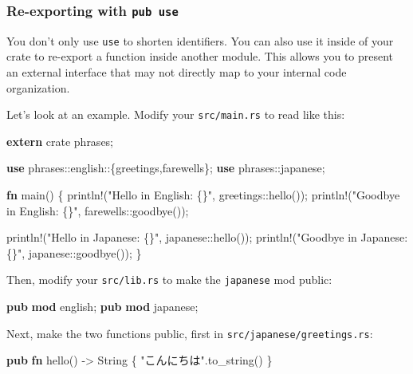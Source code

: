\documentclass[a4paper,]{book}
\newenvironment{Shaded}{\begin{snugshade}}{\end{snugshade}}
\newcommand{\KeywordTok}[1]{\textcolor[rgb]{0.13,0.29,0.53}{\textbf{{#1}}}}
\newcommand{\StringTok}[1]{\textcolor[rgb]{0.31,0.60,0.02}{{#1}}}
\newcommand{\OtherTok}[1]{\textcolor[rgb]{0.56,0.35,0.01}{{#1}}}
\newcommand{\NormalTok}[1]{{#1}}
\begin{document}
\subsubsection{\texorpdfstring{Re-exporting with
\texttt{pub\ use}}{Re-exporting with pub use}}\label{re-exporting-with-pub-use}

You don't only use \texttt{use} to shorten identifiers. You can also use
it inside of your crate to re-export a function inside another module.
This allows you to present an external interface that may not directly
map to your internal code organization.

Let's look at an example. Modify your \texttt{src/main.rs} to read like
this:

\begin{Shaded}
\begin{Highlighting}[]
\KeywordTok{extern} \NormalTok{crate phrases;}

\KeywordTok{use} \NormalTok{phrases::english::\{greetings,farewells\};}
\KeywordTok{use} \NormalTok{phrases::japanese;}

\KeywordTok{fn} \NormalTok{main() \{}
    \OtherTok{println!}\NormalTok{(}\StringTok{"Hello in English: \{\}"}\NormalTok{, greetings::hello());}
    \OtherTok{println!}\NormalTok{(}\StringTok{"Goodbye in English: \{\}"}\NormalTok{, farewells::goodbye());}

    \OtherTok{println!}\NormalTok{(}\StringTok{"Hello in Japanese: \{\}"}\NormalTok{, japanese::hello());}
    \OtherTok{println!}\NormalTok{(}\StringTok{"Goodbye in Japanese: \{\}"}\NormalTok{, japanese::goodbye());}
\NormalTok{\}}
\end{Highlighting}
\end{Shaded}

Then, modify your \texttt{src/lib.rs} to make the \texttt{japanese} mod
public:

\begin{Shaded}
\begin{Highlighting}[]
\KeywordTok{pub} \KeywordTok{mod} \NormalTok{english;}
\KeywordTok{pub} \KeywordTok{mod} \NormalTok{japanese;}
\end{Highlighting}
\end{Shaded}

Next, make the two functions public, first in
\texttt{src/japanese/greetings.rs}:

\begin{Shaded}
\begin{Highlighting}[]
\KeywordTok{pub} \KeywordTok{fn} \NormalTok{hello() -> String \{}
    \StringTok{"こんにちは"}\NormalTok{.to_string()}
\NormalTok{\}}
\end{Highlighting}
\end{Shaded}
\end{document}
